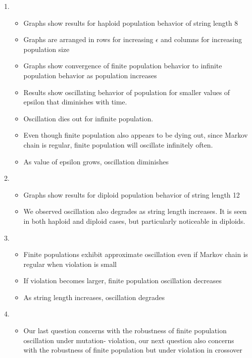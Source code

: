 \documentclass{article}
\begin{document}
\begin{enumerate}
\item
  \begin{itemize}
  \item Graphs show results for haploid population behavior of string length 8
  \item Graphs are arranged in rows for increasing $\epsilon$ and columns for increasing population size
  \item Graphs show convergence of finite population behavior to infinite population behavior as population increases
  \item Results show oscillating behavior of population for smaller values of epsilon that diminishes with time.
  \item Oscillation dies out for infinite population.
  \item Even though finite population also appears to be dying out, since Markov chain is regular, 
  finite population will oscillate infinitely often.
  \item As value of epsilon grows, oscillation diminishes
  
  \end{itemize}
  
\item
  \begin{itemize}
  \item Graphs show results for diploid population behavior of string length 12
  \item We observed oscillation also degrades as string length increases. 
  It is seen in both haploid and diploid cases, but particularly noticeable in diploids.  
  \end{itemize}
  
\item
  \begin{itemize}
  \item Finite populations exhibit approximate oscillation even if Markov chain is regular when violation is small
  \item If violation becomes larger, finite population oscillation decreases
  \item As string length increases, oscillation degrades
  \end{itemize}
  
\item
  \begin{itemize}
  \item Our last question concerns with the robustness of finite population oscillation under mutation- violation, 
  our next question also concerns with the robustness of finite population but under violation in crossover  
  \end{itemize}


\end{enumerate}
\end{document}
